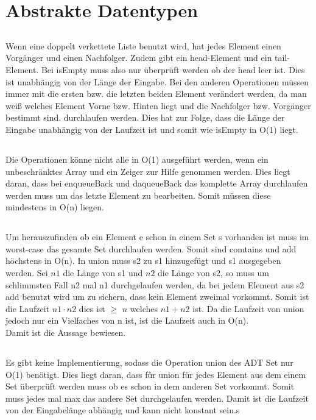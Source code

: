 \section{Abstrakte Datentypen}
\subsection{}
Wenn eine doppelt verkettete Liste benutzt wird, hat jedes Element einen Vorgänger und einen Nachfolger. Zudem gibt ein head-Element und ein tail-Element. Bei isEmpty muss also nur überprüft werden ob der head leer ist. Dies ist unabhängig von der Länge der Eingabe. Bei den anderen Operationen müssen immer mit die ersten bzw. die letzten beiden Element verändert werden, da man weiß welches Element Vorne bzw. Hinten liegt und  die Nachfolger bzw. Vorgänger bestimmt sind.  durchlaufen werden. Dies hat zur Folge, dass die Länge der Eingabe unabhängig von der Laufzeit ist und somit wie isEmpty in O(1) liegt.
\subsection{}
Die Operationen könne nicht alle in O(1) ausgeführt werden, wenn ein unbeschränktes Array und ein Zeiger zur Hilfe genommen werden. Dies liegt daran, dass bei enqueueBack und daqueueBack das komplette Array durchlaufen werden muss um das letzte Element zu bearbeiten. Somit müssen diese mindestens in O(n) liegen.
\subsection{}
Um herauszufinden ob ein Element e schon in einem Set s vorhanden ist muss im worst-case das gesamte Set durchlaufen werden. Somit sind comtains und add höchstens in O(n). In union muss s2 zu s1 hinzugefügt und s1 ausgegeben werden. Sei $n1$ die Länge von s1 und $n2$ die Länge von s2, so muss um schlimmsten Fall n2 mal n1 durchgelaufen werden, da bei jedem Element aus s2 add benutzt wird um zu sichern, dass kein Element zweimal vorkommt. Somit ist die Laufzeit $n1 \cdot n2$ dies ist $\geq$ $n$ welches $n1+n2$ ist. Da die Laufzeit von union jedoch nur ein Vielfaches von n ist, ist die Laufzeit auch in O(n). \\Damit ist die Aussage bewiesen.
\subsection*{}
Es gibt keine Implementierung, sodass die Operation union des ADT Set nur O(1) benötigt. Dies liegt daran, dass für union für jedes Element aus dem einem Set überprüft werden muss ob es schon in dem anderen Set vorkommt. Somit muss jedes mal max das andere Set durchgelaufen werden. Damit ist die Laufzeit von der Eingabelänge abhängig und kann nicht konstant sein.s